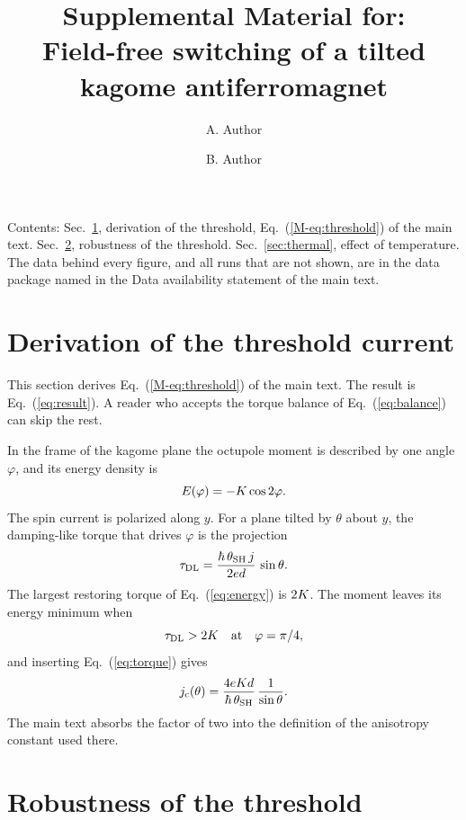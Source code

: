 \documentclass[10pt]{article}
\title{Supplemental Material for:\\ Field-free switching of a tilted kagome antiferromagnet}
\author{A. Author \and B. Author}
\date{}
\begin{document}
\maketitle

\noindent Contents: Sec.~\ref{sec:derivation}, derivation of the threshold, Eq.~(\ref{M-eq:threshold}) of
the main text. Sec.~\ref{sec:robust}, robustness of the threshold. Sec.~\ref{sec:thermal}, effect of
temperature. The data behind every figure, and all runs that are not shown, are in the data package
named in the Data availability statement of the main text.

\section{Derivation of the threshold current}
\label{sec:derivation}

This section derives Eq.~(\ref{M-eq:threshold}) of the main text. The result is Eq.~(\ref{eq:result}).
A reader who accepts the torque balance of Eq.~(\ref{eq:balance}) can skip the rest.

In the frame of the kagome plane the octupole moment is described by one angle $\varphi$, and its energy
density is
\begin{equation}
  E(\varphi) = -K \cos 2\varphi .
  \label{eq:energy}
\end{equation}
The spin current is polarized along $y$. For a plane tilted by $\theta$ about $y$, the damping-like torque
that drives $\varphi$ is the projection
\begin{equation}
  \tau_{\mathrm{DL}} = \frac{\hbar\,\theta_{\mathrm{SH}}\, j}{2 e d}\,\sin\theta .
  \label{eq:torque}
\end{equation}
The largest restoring torque of Eq.~(\ref{eq:energy}) is $2K$. The moment leaves its energy minimum when
\begin{equation}
  \tau_{\mathrm{DL}} > 2K \quad\text{at}\quad \varphi = \pi/4 ,
  \label{eq:balance}
\end{equation}
and inserting Eq.~(\ref{eq:torque}) gives
\begin{equation}
  j_{\mathrm{c}}(\theta) = \frac{4 e K d}{\hbar\,\theta_{\mathrm{SH}}}\,\frac{1}{\sin\theta} .
  \label{eq:result}
\end{equation}
The main text absorbs the factor of two into the definition of the anisotropy constant used there.

\section{Robustness of the threshold}
\label{sec:robust}
\end{document}
